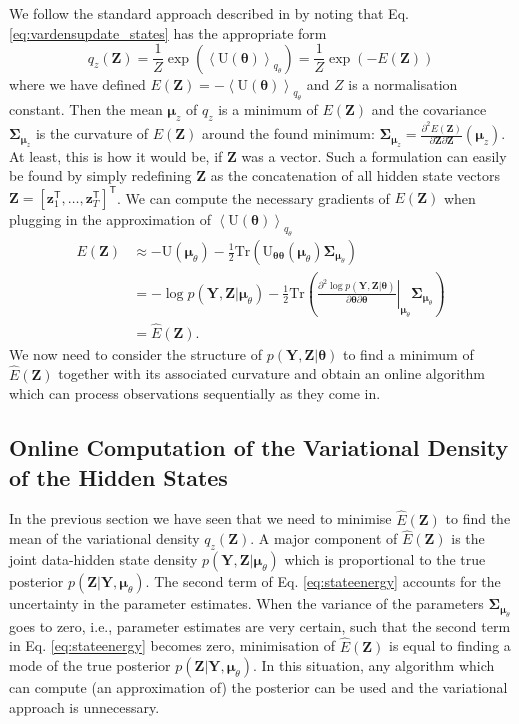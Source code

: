 \documentclass[a4paper,10pt]{article}
\newcommand{\bs}[1]{\mathbf{#1}}					%
\newcommand{\bgs}[1]{\boldsymbol{#1}}				%
\newcommand{\ppd}[3]{\frac{\partial^2 #1}{\partial #2 \partial #3}} %
\newcommand{\tr}{\mathsf{T}}				%
\newcommand{\eq}[1]{\begin{equation} #1 \end{equation}}%
\newcommand{\trace}[1]{\mathrm{Tr}\left(#1\right)}					%
\renewcommand{\ss}{z}         %
\newcommand{\spm}{\mu}    %
\renewcommand{\sp}{\theta}    %
\newcommand{\ps}{\bs{\ss}}    %
\newcommand{\ppm}{\bgs{\spm}}   %
\newcommand{\pp}{\bgs{\sp}} %
\newcommand{\Ps}{\bs{Z}}    %
\newcommand{\Po}{\bs{Y}}    %
\newcommand{\E}[2][]{\left\langle #2 \right\rangle_{#1}}	%
\newcommand{\U}{\mathrm{U}}			%
\newcommand{\Cov}{\bgs{\Sigma}}			%
\begin{document}
We follow the standard approach described in \cite[p. 255]{Murphy2012} by noting that Eq. \ref{eq:vardensupdate_states} has the appropriate form
\eq{
    q_{\ss}(\Ps) = \frac{1}{Z}\exp\left(\E[q_\sp]{\U(\pp)}\right) = \frac{1}{Z}\exp\left(-E(\Ps)\right)
}
where we have defined $E(\Ps) = -\E[q_\sp]{\U(\pp)}$ and $Z$ is a normalisation constant. Then the mean $\ppm_\ss$ of $q_\ss$ is a minimum of $E(\Ps)$ and the covariance $\Cov_{\ppm_\ss}$ is the curvature of $E(\Ps)$ around the found minimum: $\Cov_{\ppm_\ss} = \ppd{E(\Ps)}{\Ps}{\Ps}(\ppm_\ss)$. At least, this is how it would be, if $\Ps$ was a vector. Such a formulation can easily be found by simply redefining $\Ps$ as the concatenation of all hidden state vectors $\Ps = [\ps_1^\tr, \dots, \ps_T^\tr]^\tr$. We can compute the necessary gradients of $E(\Ps)$ when plugging in the approximation of $\E[q_\sp]{\U(\pp)}$
\begin{align}
    E(\Ps) &\approx - \U(\ppm_\sp) - \frac{1}{2}\trace{\U_{\pp\pp}(\ppm_\sp)\Cov_{\ppm_\sp}}\\
    \label{eq:stateenergy} &= - \log p(\Po,\Ps|\ppm_\sp) - \frac{1}{2}\trace{\left.\ppd{\log p(\Po,\Ps|\pp)}{\pp}{\pp}\right|_{\ppm_\sp}\Cov_{\ppm_\sp}}\\
    &= \hat{E}(\Ps).
\end{align}
We now need to consider the structure of $p(\Po,\Ps|\pp)$ to find a minimum of $\hat{E}(\Ps)$ together with its associated curvature and obtain an online algorithm which can process observations sequentially as they come in.


\subsection{Online Computation of the Variational Density of the Hidden States}
In the previous section we have seen that we need to minimise $\hat{E}(\Ps)$ to find the mean of the variational density $q_\ss(\Ps)$. A major component of $\hat{E}(\Ps)$ is the joint data-hidden state density $p(\Po,\Ps|\ppm_\sp)$ which is proportional to the true posterior $p(\Ps|\Po,\ppm_\sp)$. The second term of Eq. \ref{eq:stateenergy} accounts for the uncertainty in the parameter estimates. When the variance of the parameters $\Cov_{\ppm_\sp}$ goes to zero, i.e., parameter estimates are very certain, such that the second term in Eq. \ref{eq:stateenergy} becomes zero, minimisation of $\hat{E}(\Ps)$ is equal to finding a mode of the true posterior $p(\Ps|\Po,\ppm_\sp)$. In this situation, any algorithm which can compute (an approximation of) the posterior can be used and the variational approach is unnecessary. 
\end{document}
